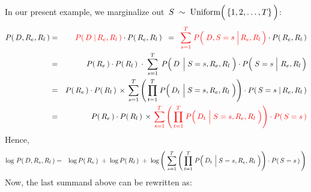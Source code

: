 \vskip 0.5cm
\noindent
In our present example, we marginalize out
\,$S \;\sim\; \textnormal{Uniform}\!\left(\,\{\overset{{\color{white}.}}{1},2,\ldots,T\}\,\right)$:
\begin{eqnarray*}
P\!\left(\,D,R_{e},R_{l}\,\right)
&=&
	{\color{red}P\!\left(\,D \;\vert\, R_{e},R_{l}\,\right)}
	\cdot
	P\!\left(\,R_{e},R_{l}\,\right)
\;\; = \;\;
	{\color{red}
	\overset{T}{\underset{s=1}{\sum}}\;
	P\!\left(\,\left.D,S\overset{{\color{white}1}}{=}s \;\right\vert R_{e},R_{l}\,\right)}
	\cdot
	P\!\left(\,R_{e},R_{l}\,\right)
\\
& = &
	P\!\left(\,R_{e}\,\right)
	\cdot
	P\!\left(\,R_{l}\,\right)
	\;\cdot\;
	\overset{T}{\underset{s=1}{\sum}}\;\,
	P\!\left(\, D \;\left\vert\;S\overset{{\color{white}1}}{=}s,R_{e},R_{l} \right.\,\right)
	\cdot
	P\!\left(\,\left.S\overset{{\color{white}1}}{=}s\;\right\vert\,R_{e},R_{l}\,\right)
\\
& = &
	P\!\left(\,R_{e}\,\right)
	\cdot
	P\!\left(\,R_{l}\,\right)
	\,\times\,
	\overset{T}{\underset{s=1}{\sum}}
	\left(\,
		\overset{T}{\underset{t=1}{\prod}}\;
		P\!\left(\,D_{t} \,\left\vert\; S\overset{{\color{white}1}}{=}s,R_{e},R_{l}\right.\,\right)
		\right)
	\cdot
	P\!\left(\,S=s \;\vert\,R_{e},R_{l}\,\right)
\\
& = &
	P\!\left(\,R_{e}\,\right)
	\cdot
	P\!\left(\,R_{l}\,\right)
	\,\times\,
	{\color{red}
	\overset{T}{\underset{s=1}{\sum}}
		\left(\,
			\overset{T}{\underset{t=1}{\prod}}\;
			P\!\left(\,D_{t} \,\left\vert\; S\overset{{\color{white}1}}{=}s,R_{e},R_{l}\right.\,\right)
			\right)
		\cdot
		P\!\left(\,S=s\,\right)
	}
\end{eqnarray*}
Hence,
\begin{eqnarray*}
\log\,P\!\left(\,D,R_{e},R_{l}\,\right)
& = &
	\log P\!\left(\,R_{e}\,\right)
	\; + \;
	\log P\!\left(\,R_{l}\,\right)
	\; + \;
	\log\left(\;
	\overset{T}{\underset{s=1}{\sum}}
		\left(\,
			\overset{T}{\underset{t=1}{\prod}}\;
			P\!\left(\,D_{t} \,\left\vert\; S\overset{{\color{white}1}}{=}s,R_{e},R_{l}\right.\,\right)
			\right)
		\cdot
		P\!\left(\,S=s\,\right)
	\,\right)
\end{eqnarray*}
Now, the last summand above can be rewritten as:
